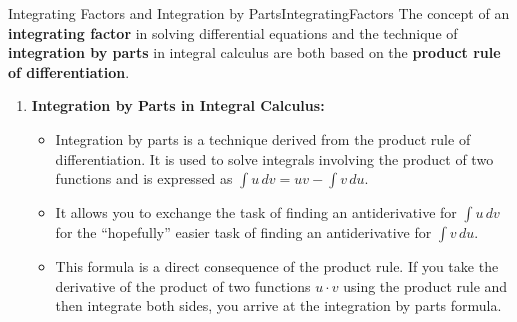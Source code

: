 \begin{factColor}{Integrating Factors and Integration by Parts}{IntegratingFactors}
The concept of an \textbf{integrating factor} in solving differential equations and the technique of \textbf{integration by parts} in integral calculus are both based on the \textbf{product rule of differentiation}. 
\begin{enumerate}
    \item \textbf{Integration by Parts in Integral Calculus:}
    \begin{itemize}
        \item Integration by parts is a technique derived from the product rule of differentiation. It is used to solve integrals involving the product of two functions and is expressed as \( \int u \, dv = uv - \int v \, du \).
        \item It allows you to exchange the task of finding an antiderivative for $\int u \, dv$ for the ``hopefully'' easier task of finding an antiderivative for $\int v \, du$. 
        \item This formula is a direct consequence of the product rule. If you take the derivative of the product of two functions \( u\cdot v \) using the product rule and then integrate both sides, you arrive at the integration by parts formula.
    \end{itemize}
    

\end{enumerate}
\end{factColor}
